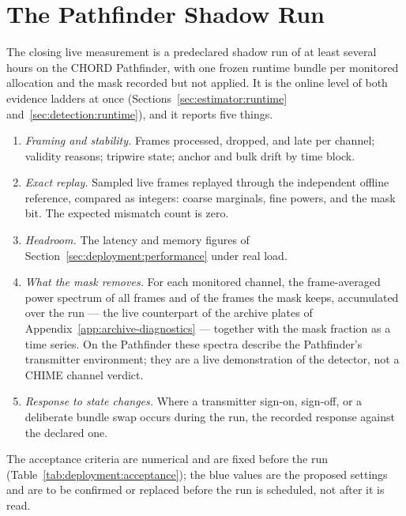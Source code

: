 \section{The Pathfinder Shadow Run}
\label{sec:deployment:results}

The closing live measurement is a predeclared shadow run of at least several
hours on the CHORD Pathfinder, with one frozen runtime bundle per monitored
allocation and the mask recorded but not applied.  It is the online level of
both evidence ladders at once (Sections~\ref{sec:estimator:runtime}
and~\ref{sec:detection:runtime}), and it reports five things.

\begin{enumerate}[leftmargin=1.6em]
\item \emph{Framing and stability.} Frames processed, dropped, and late per
channel; validity reasons; tripwire state; anchor and bulk drift by time block.
\item \emph{Exact replay.} Sampled live frames replayed through the
independent offline reference, compared as integers: coarse marginals, fine
powers, and the mask bit.  The expected mismatch count is zero.
\item \emph{Headroom.} The latency and memory figures of
Section~\ref{sec:deployment:performance} under real load.
\item \emph{What the mask removes.} For each monitored channel, the
frame-averaged power spectrum of all frames and of the frames the mask keeps,
accumulated over the run --- the live counterpart of the archive plates of
Appendix~\ref{app:archive-diagnostics} --- together with the mask fraction as
a time series.  On the Pathfinder these spectra describe the Pathfinder's
transmitter environment; they are a live demonstration of the detector, not a
CHIME channel verdict.
\item \emph{Response to state changes.} Where a transmitter sign-on, sign-off,
or a deliberate bundle swap occurs during the run, the recorded response
against the declared one.
\end{enumerate}

The acceptance criteria are numerical and are fixed before the run
(Table~\ref{tab:deployment:acceptance}); the blue values are the proposed
settings and are to be confirmed or replaced before the run is scheduled, not
after it is read.

